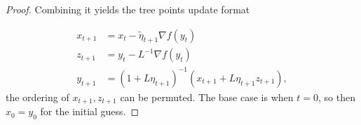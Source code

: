 \documentclass[12pt]{article}
\begin{document}
\begin{proof}
            Combining it yields the tree points update format 

            \begin{align*}
                x_{t + 1} &= x_t - \tilde \eta_{t + 1} \nabla f(y_t) 
                \\
                z_{t + 1} &= y_t - L^{-1} \nabla f(y_t) 
                \\
                y_{t + 1} &= 
                (1 + L\eta_{t + 1})^{-1}
                (
                x_{t + 1} + L\eta_{t + 1}z_{t + 1}
                ), 
            \end{align*}
            the ordering of $x_{t +1}, z_{t + 1}$ can be permuted. 
            The base case is when $t = 0$, so then $x_0 = y_0$ for the initial guess.
        \end{proof}
\end{document}
